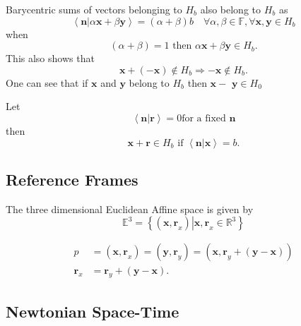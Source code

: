 \documentclass[aps,preprint]{revtex4}%
\begin{document}
Barycentric sums of vectors belonging to $H_{b}$ also belong to $H_{b}$ as
\begin{equation}
\left\langle \left.  \mathbf{n}\right\vert \alpha\mathbf{x+}\beta
\mathbf{y}\right\rangle =\left(  \alpha+\beta\right)  b\quad\forall
\alpha\mathbf{,}\beta\mathbf{\in}\mathbb{F},\forall\mathbf{x,y\in}H_{b}%
\end{equation}
when
\begin{equation}
\left(  \alpha+\beta\right)  =1\text{ then }\alpha\mathbf{x+}\beta
\mathbf{y\in}H_{b}.
\end{equation}
This also shows that
\begin{equation}
\mathbf{x+}\left(  \mathbf{-x}\right)  \notin H_{b}\Rightarrow\mathbf{-x}%
\notin H_{b}.
\end{equation}
One can see that if $\mathbf{x}$ and $\mathbf{y}$ belong to $H_{b}$ then
$\mathbf{x}-$ $\mathbf{y\in}H_{0}$

Let
\begin{equation}
\left\langle \left.  \mathbf{n}\right\vert \mathbf{r}\right\rangle =0\text{
for a fixed }\mathbf{n}%
\end{equation}
then
\begin{equation}
\mathbf{x+r\in}H_{b}\text{ if }\left\langle \left.  \mathbf{n}\right\vert
\mathbf{x}\right\rangle =b.
\end{equation}


\subsection{Reference Frames}

The three dimensional Euclidean Affine space is given by
\begin{equation}
\mathbb{E}^{3}=\left\{  \left.  \left(  \mathbf{x,r}_{x}\right)  \right\vert
\mathbf{x,r}_{x}\in\mathbb{R}^{3}\right\}
\end{equation}
%

\begin{align}
p  &  =\left(  \mathbf{x,r}_{x}\right)  =\left(  \mathbf{y,r}_{y}\right)
=\left(  \mathbf{x,r}_{y}+\left(  \mathbf{y-x}\right)  \right) \\
\mathbf{r}_{x}  &  =\mathbf{r}_{y}+\left(  \mathbf{y-x}\right)  .
\end{align}


\subsection{Newtonian Space-Time}
\end{document}
